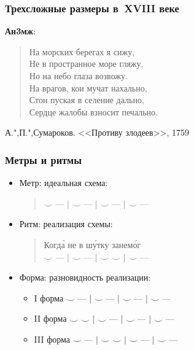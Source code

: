 \documentclass{beamer}
\begin{document}



\begin{frame}
\frametitle{Трехсложные размеры в~XVIII веке}

\textbf{Ан3мж}:
\begin{verse}
На морских берегах я сижу,\\ 
Не в пространное море гляжу,\\ 
Но на небо глаза возвожу. \\
На врагов, кои мучат нахально,\\ 
Стон пуская в селение дально, \\
Сердце жалобы взносит печально. 
\end{verse}
А.",П.",Сумароков. <<Противу злодеев>>, 1759

\end{frame}


\begin{frame}
\frametitle{Метры и ритмы}

\begin{itemize}
\item Метр: идеальная схема: \\
\begin{verse}
$\smile$ --- $\mid$ $\smile$ --- $\mid$ $\smile$ --- $\mid$ $\smile$ ---
\end{verse}
\item Ритм: реализация схемы:\\
\begin{verse}
 Когд\'{а} не в ш\'{у}тку занем\'{о}г\\
 $\smile$ --- $\mid$ $\smile$ --- $\mid$ $\smile$ $\smile$ $\mid$ $\smile$ ---
\end{verse}
\item Форма: разновидность реализации:
\begin{itemize}
\item I форма $\smile$ --- $\mid$ $\smile$ --- $\mid$ $\smile$ --- $\mid$ $\smile$ ---
\item II форма $\smile$ $\smile$ $\mid$ $\smile$ --- $\mid$ $\smile$ --- $\mid$ $\smile$ ---
\item III форма $\smile$ --- $\mid$ $\smile$ $\smile$ $\mid$ $\smile$ --- $\mid$ $\smile$ ---
\end{itemize}
\end{itemize}


\end{frame}
\end{document}
